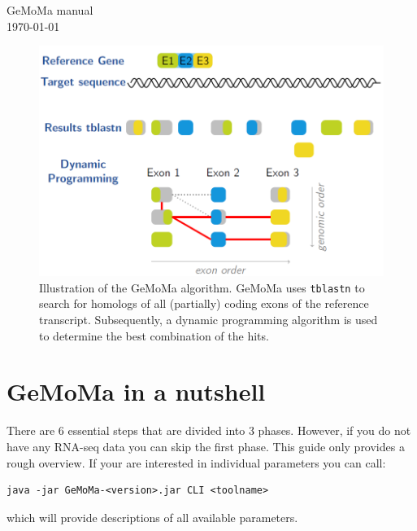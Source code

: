 \documentclass{article}
\begin{document}
\begin{center}
{\Huge GeMoMa manual}\\[5mm]
\today\\[1cm]
\begin{abstract}
Gene Model Mapper (GeMoMa) is a homology-based gene prediction program. GeMoMa uses the annotation of protein-coding genes in a reference genome to infer the annotation of protein-coding genes in a target genome. Thereby, GeMoMa utilizes amino acid and intron position conservation. In addition, GeMoMa allows to incorporate RNA-seq evidence for splice site prediction.
\end{abstract}
\end{center}

\begin{figure}[h!]
\includegraphics[width=\linewidth]{schema}
\caption{Illustration of the GeMoMa algorithm. GeMoMa uses \texttt{tblastn} to search for homologs of all (partially) coding exons of the reference transcript. Subsequently, a dynamic programming algorithm is used to determine the best combination of the hits.}
\end{figure}

\clearpage

\section{GeMoMa in a nutshell}

There are 6 essential steps that are divided into 3 phases. However, if you do not have any RNA-seq data you can skip the first phase.
This guide only provides a rough overview. If your are interested in individual parameters you can call:
\begin{verbatim}
java -jar GeMoMa-<version>.jar CLI <toolname>
\end{verbatim}
which will provide descriptions of all available parameters.
\end{document}
